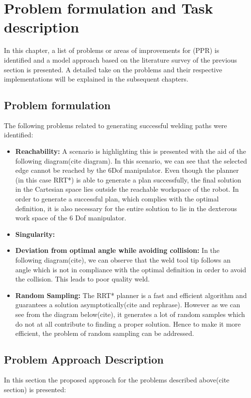 \newpage
\section{Problem formulation and Task description}
In this chapter, a list of problems or areas of improvements for \cite{7}(PPR) is identified and a model approach based on the literature survey of the previous section is presented. A detailed take on the problems and their respective implementations will be explained in the subsequent chapters.
\subsection{Problem formulation}
The following problems related to generating successful welding paths were identified:
\begin{itemize}
\item \textbf{Reachability:} A scenario is highlighting this is presented with the aid of the following diagram(cite diagram). In this scenario, we can see that the selected edge cannot be reached by the 6Dof manipulator. Even though the planner (in this case RRT*) is able to generate a plan successfully, the final solution in the Cartesian space lies outside the reachable workspace of the robot. In order to generate a successful plan, which complies with the optimal definition, it is also necessary for the entire solution to lie in the dexterous work space of the 6 Dof manipulator.
\item \textbf{Singularity:}
\item \textbf{Deviation from optimal angle while avoiding collision:} In the following diagram(cite), we can observe that the weld tool tip follows an angle which is not in compliance with the optimal definition in order to avoid the collision. This leads to poor quality weld.
\item \textbf{Random Sampling:} The RRT* planner is a fast and efficient algorithm and guarantees  a solution asymptotically(cite and rephrase). However as we can see from the diagram below(cite), it generates a lot of random samples which do not at all contribute to finding a proper solution. Hence to make it more efficient, the problem of random sampling can be addressed.
\end{itemize}


\subsection{Problem Approach Description}
In this section the proposed approach for the problems described above(cite section) is presented:

